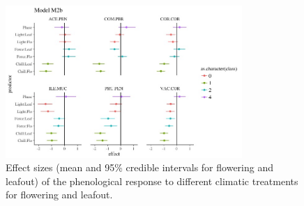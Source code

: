 \documentclass{article}\usepackage[]{graphicx}\usepackage[]{color}
\begin{document}
\begin{figure}[here]
\includegraphics[width=0.8\textwidth]{..//figures/Goods_mod2b.jpeg}
\caption{Effect sizes (mean and 95\% credible intervals for flowering and leafout) of the phenological response to different climatic treatments for flowering and leafout.}
\label{fig:Figure 5}
\end{figure}
\end{document}
